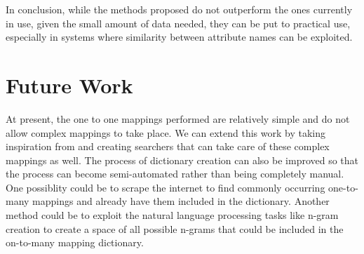 \documentclass[conference]{IEEEtran}
\begin{document}
In conclusion, while the methods proposed do not outperform the ones currently in use, given the small amount of data needed, they can be put to practical use, especially in systems where similarity between attribute names can be exploited. 

\section{Future Work}
At present, the one to one mappings performed are relatively simple and do not allow complex mappings to take place. We can extend this work by taking inspiration from \cite{ref5} and creating searchers that can take care of these complex mappings as well. The process of dictionary creation can also be improved so that the process can become semi-automated rather than being completely manual. One possiblity could be to scrape the internet to find commonly occurring one-to-many mappings and already have them included in the dictionary. Another method could be to exploit the natural language processing tasks like n-gram creation to create a space of all possible n-grams that could be included in the on-to-many mapping dictionary. 



%
%

\end{document}
